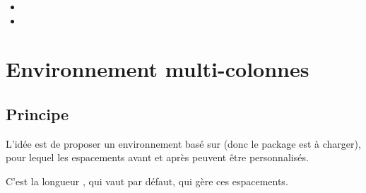 \documentclass[french,11pt,a4paper]{article}
\begin{document}
\begin{DemoCode}{}
\lipsum[1][1-3]

\begin{Centrage}
    \lipsum[1][1]
\end{Centrage}

\lipsum[1][1-2]
\end{DemoCode}

\begin{DemoCode}{}
\lipsum[1][1-3]

\begin{Centrage}[Avant=0pt,Apres=0pt]
    \lipsum[1][1]
\end{Centrage}

\lipsum[1][1-2]
\end{DemoCode}

\begin{DemoCode}{}
\lipsum[2][3]

\begin{itemize}
    \item \lipsum[1][1]
    \item \lipsum[1][2]
\end{itemize}

\begin{Centrage}[Avant=-0.25\baselineskip]
    \lipsum[1][1]
\end{Centrage}

\lipsum[1][1-2]
\end{DemoCode}

\pagebreak

\section{Environnement multi-colonnes}

\subsection{Principe}

L'idée est de proposer un environnement basé sur  (donc le package  est à charger), pour lequel les espacements avant et après peuvent être personnalisés.

C'est la longueur , qui vaut  par défaut, qui gère ces espacements.

\smallskip
\end{document}
